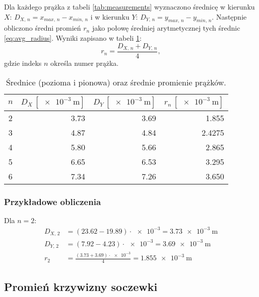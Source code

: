 \documentclass[a4paper,12pt]{article}
\begin{document}
Dla każdego prążka z tabeli \ref{tab:measurements} wyznaczono średnicę w kierunku $X$: $D_{X,\,n} = x_{max,\,n} - x_{min,\,n}$ i w kierunku $Y$: $D_{Y,\,n} = y_{max,\,n} - y_{min,\,n}$. Następnie obliczono średni promień $r_{n}$ jako połowę średniej arytmetycznej tych średnic \eqref{eq:avg_radius}. Wyniki zapisano w tabeli \ref{tab:radii}:
\begin{equation}
    \label{eq:avg_radius}
    r_{n} = \frac{D_{X,\,n} + D_{Y,\,n}}{4},
\end{equation}
gdzie indeks $n$ określa numer prążka.

\begin{table}[H]
    \centering
    \begin{tabular}{|c|r|r|r|}
        \hline
        \textbf{$n$} & \textbf{$D_{X}\,[\SI{e-3}{\meter}]$} & \textbf{$D_{Y}\,[\SI{e-3}{\meter}]$} & \textbf{$r_{n}\,[\SI{e-3}{\meter}]$} \\
        \hline
        \num{2} & \num{3.73} & \num{3.69} & \num{1.855} \\ \hline
        \num{3} & \num{4.87} & \num{4.84} & \num{2.4275} \\ \hline
        \num{4} & \num{5.80} & \num{5.66} & \num{2.865} \\ \hline
        \num{5} & \num{6.65} & \num{6.53} & \num{3.295} \\ \hline
        \num{6} & \num{7.34} & \num{7.26} & \num{3.650} \\ \hline
    \end{tabular}
    \caption{Średnice (pozioma i pionowa) oraz średnie promienie prążków.}
    \label{tab:radii}
\end{table}


\subsubsection*{Przykładowe obliczenia}
Dla $n=2$:
\begin{align*}
    D_{X,\,2} & = (\num{23.62} - \num{19.89})\cdot \num{e-3} = \SI{3.73e-3}{\meter}          \\
    D_{Y,\,2} & = (\num{7.92} - \num{4.23})\cdot \num{e-3}= \SI{3.69e-3}{\meter}             \\
    r_{2}     & = \frac{(\num{3.73} + \num{3.69})\cdot \num{e-3}}{4} = \SI{1.855e-3}{\meter}
\end{align*}

\subsection{Promień krzywizny soczewki}
\end{document}
